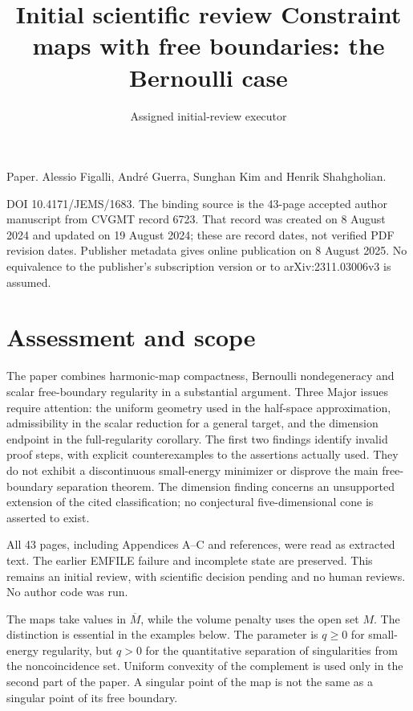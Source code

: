 \documentclass[10pt]{article}
\title{Initial scientific review
Constraint maps with free boundaries: the Bernoulli case}
\author{Assigned initial-review executor}
\date{}
\begin{document}
\maketitle
Paper. Alessio Figalli, André Guerra, Sunghan Kim and Henrik Shahgholian.\par
DOI 10.4171/JEMS/1683. The binding source is the 43-page accepted author manuscript from CVGMT record 6723. That record was created on 8 August 2024 and updated on 19 August 2024; these are record dates, not verified PDF revision dates. Publisher metadata gives online publication on 8 August 2025. No equivalence to the publisher’s subscription version or to arXiv:2311.03006v3 is assumed.\par
\section*{Assessment and scope}
The paper combines harmonic-map compactness, Bernoulli nondegeneracy and scalar free-boundary regularity in a substantial argument. Three Major issues require attention: the uniform geometry used in the half-space approximation, admissibility in the scalar reduction for a general target, and the dimension endpoint in the full-regularity corollary. The first two findings identify invalid proof steps, with explicit counterexamples to the assertions actually used. They do not exhibit a discontinuous small-energy minimizer or disprove the main free-boundary separation theorem. The dimension finding concerns an unsupported extension of the cited classification; no conjectural five-dimensional cone is asserted to exist.\par
All 43 pages, including Appendices A–C and references, were read as extracted text. The earlier EMFILE failure and incomplete state are preserved. This remains an initial review, with scientific decision pending and no human reviews. No author code was run.\par
The maps take values in \(\overline M\), while the volume penalty uses the open set \(M\). The distinction is essential in the examples below. The parameter is \(q\ge0\) for small-energy regularity, but \(q>0\) for the quantitative separation of singularities from the noncoincidence set. Uniform convexity of the complement is used only in the second part of the paper. A singular point of the map is not the same as a singular point of its free boundary.\par
\end{document}

